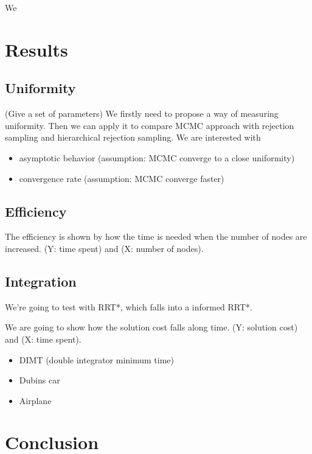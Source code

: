 \documentclass[letterpaper, 10 pt, conference]{ieeeconf}  %
\begin{document}
We 

\section{Results}

\subsection{Uniformity}

(Give a set of parameters)
We firstly need to propose a way of measuring uniformity.
Then we can apply it to compare MCMC approach with rejection sampling and hierarchical rejection sampling.
We are interested with
\begin{itemize}
	\item asymptotic behavior (assumption: MCMC converge to a close uniformity)
	\item convergence rate (assumption: MCMC converge faster)
\end{itemize}

\subsection{Efficiency}

The efficiency is shown by how the time is needed when the number of nodes are increased.
(Y: time spent) and (X: number of nodes).

\subsection{Integration}

We're going to test with RRT*, which falls into a informed RRT*.

We are going to show how the solution cost falls along time.
(Y: solution cost) and (X: time spent).

\begin{itemize}
\item DIMT (double integrator minimum time)
\item Dubins car
\item Airplane
\end{itemize}

\section{Conclusion}








%
\end{document}
